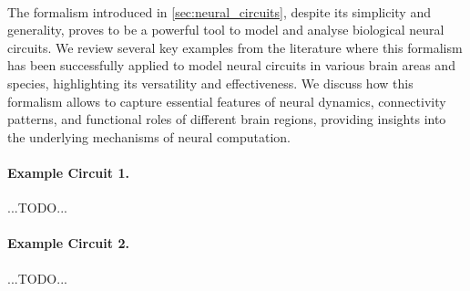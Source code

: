 
\paragraph{} The formalism introduced in \cref{sec:neural_circuits}, despite its simplicity and generality, proves to be a powerful tool to model and analyse biological neural circuits. We review several key examples from the literature where this formalism has been successfully applied to model neural circuits in various brain areas and species, highlighting its versatility and effectiveness. We discuss how this formalism allows to capture essential features of neural dynamics, connectivity patterns, and functional roles of different brain regions, providing insights into the underlying mechanisms of neural computation.

\paragraph{Example Circuit 1.} ...TODO...

\paragraph{Example Circuit 2.} ...TODO...

